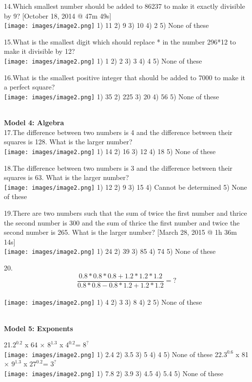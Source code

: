 \documentclass[
]{article}
\begin{document}
14.Which smallest number should be added to 86237 to make it exactly divisible by 9? [October 18, 2014 @ 47m 49s] \\
\texttt{[image: images/image2.png]} 1) 11 	2) 9 	3) 10 	4) 2 	5) None of these

15.What is the smallest digit which should replace * in the number 296*12 to make it divisible by 12?\\
\texttt{[image: images/image2.png]} 1) 1 2) 2 3) 3 4) 4 5) None of these

16.What is the smallest positive integer that should be added to 7000 to make it a perfect square?\\
\texttt{[image: images/image2.png]} 1) 35 	2) 225 	3) 20 	4) 56 	5) None of these

\textbf{ \\ Model 4: Algebra \\}
17.The difference between two numbers is 4 and the difference between their squares is 128. What is the larger number?\\
\texttt{[image: images/image2.png]} 	1) 14 	2) 16 	3) 12 4) 18 5) None of these

18.The difference between two numbers is 3 and the difference between their squares is 63. What is the larger number?\\
\texttt{[image: images/image2.png]}  1) 12 2) 9 3) 15 4) Cannot be determined 5) None of these

19.There are two numbers such that the sum of twice the first number and thrice the second number is 300 and the sum of thrice the first number and twice the second number is 265. What is the larger number? [March 28, 2015 @ 1h 36m 14s] \\
\texttt{[image: images/image2.png]} 1) 24 	2) 39 	3) 85 	4) 74 	5) None of these

20. \[  \dfrac{0.8 * 0.8 * 0.8 + 1.2 * 1.2 * 1.2}{0.8 * 0.8 - 0.8 * 1.2 + 1.2 * 1.2} = ? \] \\
\texttt{[image: images/image2.png]} 1) 4 	2) 3 	3) 8 	4) 2 	5) None of these

\textbf{ \\ Model 5: Exponents  \\}

21.$ 2^{0.2} $ x  64 × $ 8^{1.3} $ x $ 4^{0.2} $= $ 8^{? }$\\
\texttt{[image: images/image2.png]} 1) 2.4 	2) 3.5 3) 5 4) 4 5) None of these
22.$ 3^{0.6} $ x  81 × $ 9^{1.3} $ x $ 27^{0.2} $= $ 3^{?}$\\
\texttt{[image: images/image2.png]} 1) 7.8 	2) 3.9 	3) 4.5 	4) 5.4 	5) None of these
\end{document}
